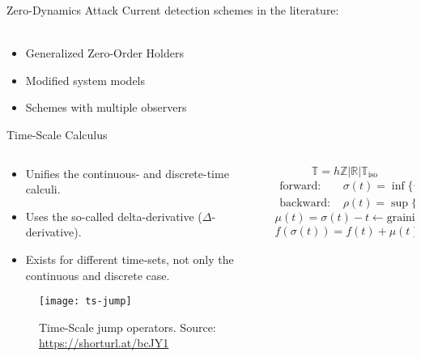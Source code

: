 \begin{slide}{Zero-Dynamics Attack}
  Current detection schemes in the literature:\\~\\
  \begin{itemize}
    \item Generalized Zero-Order Holders
    \item Modified system models
    \item Schemes with multiple observers
  \end{itemize}
\end{slide}

\begin{slide}{Time-Scale Calculus}
  \begin{columns}[c]
    \begin{column}{0.48\textwidth}
      \begin{itemize}
        \item Unifies the continuous- and discrete-time calculi.
        \item Uses the so-called delta-derivative (\(\Delta\)-derivative).
        \item Exists for different time-sets, not only the continuous and
              discrete case.
      \end{itemize}
      \begin{figure}[ht!]
        \centering
        \texttt{[image: ts-jump]}
        \caption{Time-Scale jump operators. Source: \url{https://shorturl.at/bcJY1}}%
      \end{figure}
    \end{column}%
    \hfill%
    \begin{column}{0.48\textwidth}
      \begin{equation}
        \mathbb{T} = h\mathbb{Z} | \mathbb{R} | \mathbb{T}_{\textrm{iso}}
      \end{equation}
      \begin{align}
        \textrm{forward:~}  & \sigma(t) = \inf\{\tau\in\mathbb{T}|\tau>t\}, \\
        \textrm{backward:~} & \rho(t) = \sup\{\tau\in\mathbb{T}|\tau<t\}.
      \end{align}
      \begin{equation}
        \mu(t) = \sigma(t)-t \leftarrow \textrm{graininess}
      \end{equation}
      \begin{equation}
        f(\sigma(t)) = f(t) + \mu(t)f^{\Delta}(t).
      \end{equation}
    \end{column}%
  \end{columns}
\end{slide}

